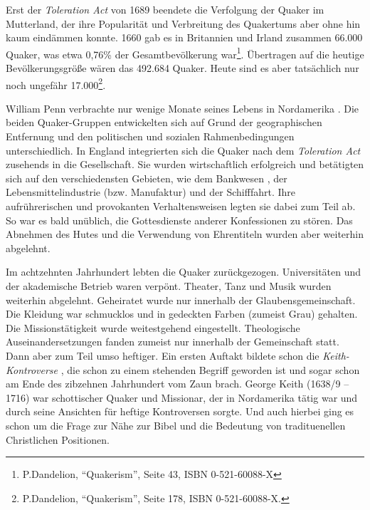 \medskip

Erst der \textit{Toleration Act}  von 1689 beendete die
Verfolgung der Quaker im
Mutterland, der ihre Popularität und Verbreitung des Quakertums aber ohne hin
kaum eindämmen konnte.
  1660 gab
es in Britannien  und Irland 
zusammen
66.000 Quaker, was etwa 0,76\% der
Gesamtbevölkerung war\footnote{P.Dandelion, "`Quakerism"', Seite 43, ISBN
0-521-60088-X}. Übertragen auf die heutige Bevölkerungsgröße wären das 492.684
Quaker. Heute sind es aber tatsächlich nur noch ungefähr
17.000\footnote{P.Dandelion, "`Quakerism"', Seite 178, ISBN 0-521-60088-X.}.

\medskip

William Penn verbrachte nur wenige Monate seines Lebens in Nordamerika
. Die beiden
Quaker-Gruppen entwickelten sich auf Grund der geographischen Entfernung und den
politischen und sozialen Rahmenbedingungen unterschiedlich. In
England integrierten sich die Quaker nach dem \textit{Toleration Act} zusehends
in die Gesellschaft. Sie wurden  wirtschaftlich
erfolgreich und betätigten sich
auf den verschiedensten Gebieten, wie dem Bankwesen , der
Lebensmittelindustrie 
(bzw. Manufaktur) und der Schifffahrt. Ihre aufrührerischen und provokanten
Verhaltensweisen legten sie dabei zum Teil ab. So war es bald unüblich, die
Gottesdienste  anderer Konfessionen
 zu stören. Das Abnehmen des Hutes und die
Verwendung von Ehrentiteln wurden aber weiterhin abgelehnt.

\medskip

Im achtzehnten Jahrhundert lebten die Quaker zurückgezogen.
Universitäten  und der akademische Betrieb waren verpönt.
 Theater, Tanz  und Musik 
wurden weiterhin abgelehnt. Geheiratet  wurde nur innerhalb der
Glaubensgemeinschaft. Die Kleidung  war schmucklos und in
gedeckten Farben
(zumeist Grau) gehalten. Die Missionstätigkeit wurde weitestgehend eingestellt.
Theologische Auseinandersetzungen fanden zumeist nur innerhalb der Gemeinschaft
statt. Dann aber zum Teil umso heftiger. Ein ersten Auftakt bildete schon die
\textit{Keith-Kontroverse} , die schon zu einem
stehenden Begriff geworden ist und sogar schon am Ende des zibzehnen Jahrhundert
vom Zaun brach. George Keith (1638/9 -- 1716) 
war schottischer
Quaker und Missionar, der in
Nordamerika tätig war und durch seine Ansichten für heftige Kontroversen
sorgte. Und auch hierbei ging es schon um die Frage zur Nähe zur Bibel und die
Bedeutung von tradituenellen Christlichen Positionen.

